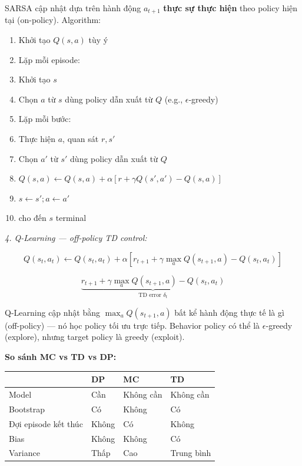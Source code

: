 \documentclass[12pt,a4paper]{article}
\begin{document}
SARSA cập nhật dựa trên hành động $a_{t+1}$ \textbf{thực sự thực hiện} theo policy hiện tại (on-policy). Algorithm:
\begin{enumerate}[leftmargin=1.8em]
    \item Khởi tạo $Q(s,a)$ tùy ý
    \item Lặp mỗi episode:
    \item \quad Khởi tạo $s$
    \item \quad Chọn $a$ từ $s$ dùng policy dẫn xuất từ $Q$ (e.g., $\epsilon$-greedy)
    \item \quad Lặp mỗi bước:
    \item \quad\quad Thực hiện $a$, quan sát $r, s'$
    \item \quad\quad Chọn $a'$ từ $s'$ dùng policy dẫn xuất từ $Q$
    \item \quad\quad $Q(s,a) \leftarrow Q(s,a) + \alpha[r + \gamma Q(s',a') - Q(s,a)]$
    \item \quad\quad $s \leftarrow s'; a \leftarrow a'$
    \item \quad cho đến $s$ terminal
\end{enumerate}

\textit{4. Q-Learning --- off-policy TD control:}

\begin{equation}
Q(s_t,a_t)
\leftarrow
Q(s_t,a_t)
+
\alpha
\left[
r_{t+1}
+
\gamma \max_a Q(s_{t+1},a)
-
Q(s_t,a_t)
\right]
\end{equation}

\begin{equation}
\underbrace{
r_{t+1}
+
\gamma \max_a Q(s_{t+1},a)
-
Q(s_t,a_t)
}_{\text{TD error } \delta_t}
\end{equation}

Q-Learning cập nhật bằng $\max_a Q(s_{t+1},a)$ bất kể hành động thực tế là gì (off-policy) --- nó học policy tối ưu trực tiếp. Behavior policy có thể là $\epsilon$-greedy (explore), nhưng target policy là greedy (exploit).

\textbf{So sánh MC vs TD vs DP:}

\begin{table}[htbp]
\centering
\small
\begin{tabularx}{\textwidth}{>{\raggedright\arraybackslash}p{2.5cm}XXX}
\toprule
& \textbf{DP} & \textbf{MC} & \textbf{TD} \\
\midrule
Model & Cần & Không cần & Không cần \\
Bootstrap & Có & Không & Có \\
Đợi episode kết thúc & Không & Có & Không \\
Bias & Không & Không & Có \\
Variance & Thấp & Cao & Trung bình \\
\bottomrule
\end{tabularx}
\end{table}
\end{document}

